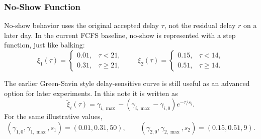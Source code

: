 \documentclass[11pt]{article}
\begin{document}
\subsubsection{No-Show Function}

No-show behavior uses the original accepted delay \(\tau\), not the residual delay \(r\) on a later
day. In the current FCFS baseline, no-show is represented with a step function, just like balking:
\[
\xi_1(\tau)=
\begin{cases}
0.01, & \tau<21,\\
0.31, & \tau\ge 21,
\end{cases}
\qquad
\xi_2(\tau)=
\begin{cases}
0.15, & \tau<14,\\
0.51, & \tau\ge 14.
\end{cases}
\]

The earlier Green-Savin style delay-sensitive curve is still useful as an advanced option for later
experiments. In this note it is written as
\[
\tilde{\xi}_i(\tau)
=
\gamma_{i,\max}
-
(\gamma_{i,\max}-\gamma_{i,0})e^{-\tau/s_i}.
\]
For the same illustrative values,
\[
(\gamma_{1,0},\gamma_{1,\max},s_1)=(0.01,0.31,50),
\qquad
(\gamma_{2,0},\gamma_{2,\max},s_2)=(0.15,0.51,9).
\]
\end{document}
